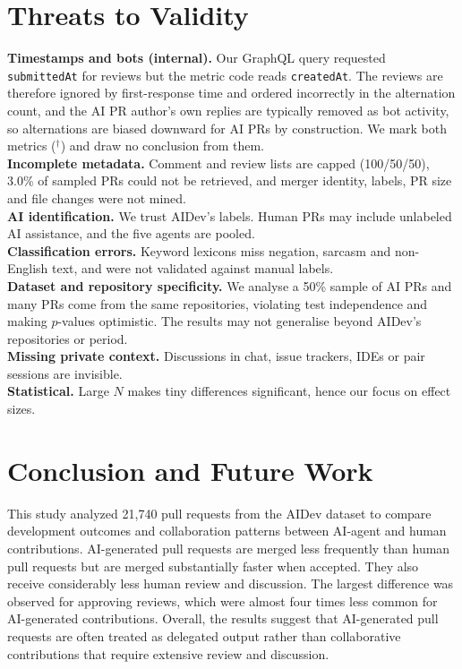 \documentclass[conference]{IEEEtran}
\begin{document}
\section{Threats to Validity}
\textbf{Timestamps and bots (internal).} Our GraphQL query requested \texttt{submittedAt} for reviews but the metric code reads \texttt{createdAt}. The reviews are therefore ignored by first-response time and ordered incorrectly in the alternation count, and the AI PR author's own replies are typically removed as bot activity, so alternations are biased downward for AI PRs by construction. We mark both metrics ($^\dagger$) and draw no conclusion from them. \\
\textbf{Incomplete metadata.} Comment and review lists are capped (100/50/50), 3.0\% of sampled PRs could not be retrieved, and merger identity, labels, PR size and file changes were not mined. \\
\textbf{AI identification.} We trust AIDev's labels. Human PRs may include unlabeled AI assistance, and the five agents are pooled. \\
\textbf{Classification errors.} Keyword lexicons miss negation, sarcasm and non-English text, and were not validated against manual labels. \\
\textbf{Dataset and repository specificity.} We analyse a 50\% sample of AI PRs and many PRs come from the same repositories, violating test independence and making $p$-values optimistic. The results may not generalise beyond AIDev's repositories or period. \\
\textbf{Missing private context.} Discussions in chat, issue trackers, IDEs or pair sessions are invisible. \\
\textbf{Statistical.} Large $N$ makes tiny differences significant, hence our focus on effect sizes. \\

\section{Conclusion and Future Work} 
This study analyzed 21,740 pull requests from the AIDev dataset to compare development outcomes and collaboration patterns between AI-agent and human contributions. AI-generated pull requests are merged less frequently than human pull requests but are merged substantially faster when accepted. They also receive considerably less human review and discussion. The largest difference was observed for approving reviews, which were almost four times less common for AI-generated contributions. Overall, the results suggest that AI-generated pull requests are often treated as delegated output rather than collaborative contributions that require extensive review and discussion.
\end{document}

